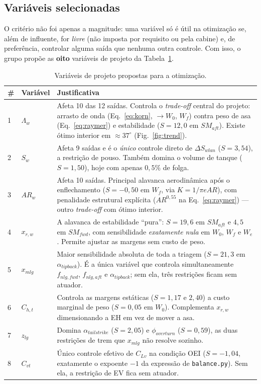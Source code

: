 \documentclass[11pt,a4paper]{article}
\newcommand{\code}[1]{\texttt{\small #1}}
\begin{document}
\subsection{Vari\'aveis selecionadas}

O crit\'erio n\~ao foi apenas a magnitude: uma vari\'avel s\'o \'e \'util na
otimiza\c{c}\~ao se, al\'em de influente, for \emph{livre} (n\~ao imposta por
requisito ou pela cabine) e, de prefer\^encia, controlar alguma sa\'ida que
nenhuma outra controle. Com isso, o grupo prop\~oe as \textbf{oito} vari\'aveis
de projeto da Tabela~\ref{tab:escolha}.

\begin{table}[H]
\centering
\caption{Vari\'aveis de projeto propostas para a otimiza\c{c}\~ao.}
\label{tab:escolha}
\small
\begin{tabular}{llp{8.4cm}}
\toprule
\# & Vari\'avel & Justificativa \\
\midrule
1 & $\Lambda_w$ & Afeta 10 das 12 sa\'idas. Controla o \emph{trade-off} central
    do projeto: arrasto de onda (Eq.~\ref{eq:korn}, $\to W_0$, $W_f$) contra peso
    de asa (Eq.~\ref{eq:raymer}) e estabilidade ($S = 12{,}0$ em $SM_{aft}$).
    Existe \'otimo interior em $\approx 37^\circ$ (Fig.~\ref{fig:trend}). \\[2pt]
2 & $S_w$ & Afeta 9 sa\'idas e \'e o \emph{\'unico} controle direto de
    $\Delta S_{wlan}$ ($S = 3{,}54$), a restri\c{c}\~ao de pouso. Tamb\'em domina
    o volume de tanque ($S = 1{,}50$), hoje com apenas $0{,}5\%$ de folga. \\[2pt]
3 & $AR_w$ & Afeta 10 sa\'idas. Principal alavanca aerodin\^amica ap\'os o
    enflechamento ($S = -0{,}50$ em $W_f$, via $K = 1/\pi e AR$), com penalidade
    estrutural expl\'icita ($AR^{0{,}55}$ na Eq.~\ref{eq:raymer}) --- outro
    \emph{trade-off} com \'otimo interior. \\[2pt]
4 & $x_{r,w}$ & A alavanca de estabilidade ``pura'': $S = 19{,}6$ em $SM_{aft}$ e
    $4{,}5$ em $SM_{fwd}$, com sensibilidade \emph{exatamente nula} em $W_0$,
    $W_f$ e $W_e$. Permite ajustar as margens sem custo de peso. \\[2pt]
5 & $x_{mlg}$ & Maior sensibilidade absoluta de toda a triagem
    ($S = 21{,}3$ em $\alpha_{tipback}$). \'E a \'unica vari\'avel que controla
    simultaneamente $f_{nlg,fwd}$, $f_{nlg,aft}$ e $\alpha_{tipback}$; sem ela,
    tr\^es restri\c{c}\~oes ficam sem atuador. \\[2pt]
6 & $C_{h,t}$ & Controla as margens est\'aticas ($S = 1{,}17$ e $2{,}40$) a custo
    marginal de peso ($S = 0{,}05$ em $W_0$). Complementa $x_{r,w}$ dimensionando
    a EH em vez de mover a asa. \\[2pt]
7 & $z_{lg}$ & Domina $\alpha_{tailstrike}$ ($S = 2{,}05$) e $\phi_{overturn}$
    ($S = 0{,}59$), as duas restri\c{c}\~oes de trem que $x_{mlg}$ n\~ao resolve
    sozinho. \\[2pt]
8 & $C_{vt}$ & \'Unico controle efetivo de $C_{Lv}$ na condi\c{c}\~ao OEI
    ($S = -1{,}04$, exatamente o expoente $-1$ da express\~ao de
    \code{balance.py}). Sem ela, a restri\c{c}\~ao de EV fica sem atuador. \\
\bottomrule
\end{tabular}
\end{table}
\end{document}
